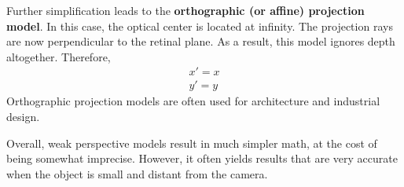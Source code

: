\documentclass[a4paper, 12pt]{article}
\renewcommand\emph{\textbf}
\begin{document}
Further simplification leads to the \emph{orthographic (or affine) projection model}. In this case, the optical center is located at infinity. The projection rays are now perpendicular to the retinal plane. As a result, this model ignores depth altogether.  Therefore,
\begin{align*}
    x' = x\\
    y' = y
\end{align*}
Orthographic projection models are often used for architecture and industrial design.

Overall, weak perspective models result in much simpler math, at the cost of being somewhat imprecise. However, it often yields results that are very accurate when the object is small and distant from the camera. 
\end{document}
